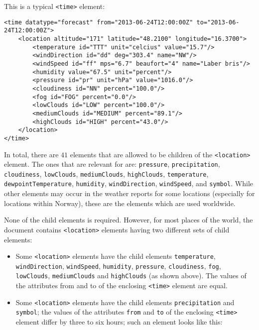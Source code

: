 This is a typical \texttt{<time>} element:

\begin{lstlisting}
<time datatype="forecast" from="2013-06-24T12:00:00Z" to="2013-06-24T12:00:00Z">
	<location altitude="171" latitude="48.2100" longitude="16.3700">
		<temperature id="TTT" unit="celcius" value="15.7"/>
		<windDirection id="dd" deg="303.4" name="NW"/>
		<windSpeed id="ff" mps="6.7" beaufort="4" name="Laber bris"/>
		<humidity value="67.5" unit="percent"/>
		<pressure id="pr" unit="hPa" value="1016.0"/>
		<cloudiness id="NN" percent="100.0"/>
		<fog id="FOG" percent="0.0"/>
		<lowClouds id="LOW" percent="100.0"/>
		<mediumClouds id="MEDIUM" percent="89.1"/>
		<highClouds id="HIGH" percent="43.0"/>
	</location>
</time>
\end{lstlisting}

In total, there are $41$ elements that are allowed to be children of the \texttt{<location>} element. The ones that are relevant for \smarthomeweather are: \texttt{pressure}, \texttt{precipitation}, \texttt{cloudiness}, \texttt{lowClouds}, \texttt{mediumClouds}, \texttt{highClouds}, \texttt{temperature}, \texttt{dewpoint\hspace{0pt}Temperature}, \texttt{humidity}, \texttt{windDirection}, \texttt{windSpeed}, and \texttt{symbol}. While other elements may occur in the weather reports for some locations (especially for locations within Norway), these are the elements which are used worldwide.

None of the child elements is required. However, for most places of the world, the  document contains \texttt{<location>} elements having two different sets of child elements:

\begin{itemize}
  \item Some \texttt{<location>} elements have the child elements \texttt{temperature}, \texttt{windDirection}, \texttt{windSpeed}, \texttt{humidity}, \texttt{pressure}, \texttt{cloudiness}, \texttt{fog}, \texttt{lowClouds}, \texttt{mediumClouds} and \texttt{highClouds} (as shown above). The values of the attributes from and to of the enclosing \texttt{<time>} element are equal.
  \item Some \texttt{<location>} elements have the child elements \texttt{precipitation} and \texttt{symbol}; the values of the attributes \texttt{from} and \texttt{to} of the enclosing \texttt{<time>} element differ by three to six hours; such an element looks like this:
\end{itemize}

